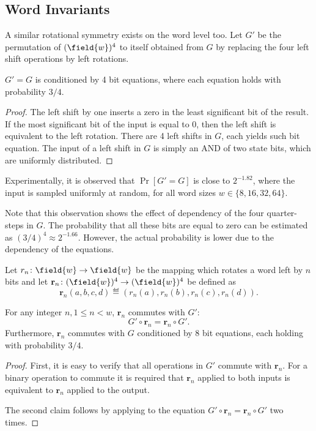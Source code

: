 \subsection{Word Invariants}

\newcommand\rr{\mathbf{r}}
A similar rotational symmetry exists on the word level too. 
Let $G'$ be the permutation of $(\field{w})^4$ to itself obtained from $G$ by replacing the four left shift operations by left rotations.

\begin{proposition}
$G' = G$ is conditioned by 4 bit equations, where each equation holds with probability $3/4$.
\end{proposition}
\begin{proof}
The left shift by one inserts a zero in the least significant bit of the result. If the most significant bit of the input is equal to 0, then the left shift is equivalent to the left rotation. There are 4 left shifts in $G$, each yields such bit equation. The input of a left shift in $G$ is simply an AND of two state bits, which are uniformly distributed.
\end{proof}

\begin{observation}
Experimentally, it is observed that $\Pr[G' = G]$ is close to $2^{-1.82}$, where the input is sampled uniformly at random, for all word sizes $w \in \{8,16,32,64\}$.
\end{observation}

Note that this observation shows the effect of dependency of the four quarter-steps in $G$. The probability that all these bits are equal to zero can be estimated as $(3/4)^4 \approx 2^{-1.66}$. However, the actual probability is lower due to the dependency of the equations. 

\begin{definition}
Let $r_n\colon \field{w} \to \field{w}$ be the mapping which rotates a word left by $n$ bits and let $\rr_n \colon (\field{w})^4 \to (\field{w})^4$ be defined as
$$
\rr_n(a,b,c,d) \eqdef (r_n(a), r_n(b), r_n(c), r_n(d)).
$$
\end{definition}

\begin{proposition}
For any integer $n, 1 \le n < w$, $\rr_n$ commutes with $G'$:
$$
G' \circ \rr_n = \rr_n \circ G'.
$$
Furthermore, $\rr_n$ commutes with $G$ conditioned by 8 bit equations, each holding with probability $3/4$.
\end{proposition}
\begin{proof}
First, it is easy to verify that all operations in $G'$ commute with $\rr_n$. For a binary operation to commute it is required that $\rr_n$ applied to both inputs is equivalent to $\rr_n$ applied to the output.

The second claim follows by applying  to the equation $G' \circ \rr_n = \rr_n \circ G'$ two times.
\end{proof}

